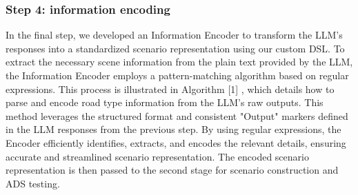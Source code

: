 \subsubsection{Step 4: information encoding}
In the final step, we developed an Information Encoder to transform the LLM's responses into a standardized scenario representation using our custom DSL. To extract the necessary scene information from the plain text provided by the LLM, the Information Encoder employs a pattern-matching algorithm based on regular expressions. This process is illustrated in Algorithm [1]
, which details how to parse and encode road type information from the LLM's raw outputs.
This method leverages the structured format and consistent "Output" markers defined in the LLM responses from the previous step. By using regular expressions, the Encoder efficiently identifies, extracts, and encodes the relevant details, ensuring accurate and streamlined scenario representation. The encoded scenario representation is then passed to the second stage for scenario construction and ADS testing.
